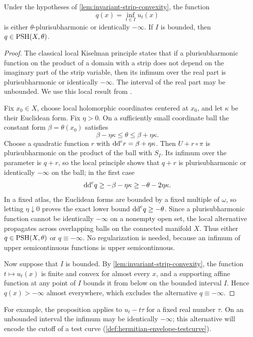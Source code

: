 \begin{proposition}\label{prop:hermitian-kiselman}
Under the hypotheses of \cref{lem:invariant-strip-convexity}, the function
\[
 q(x)=\inf_{t\in I}u_t(x)
\]
is either $\theta$-plurisubharmonic or identically $-\infty$. If $I$ is bounded, then $q\in\mathrm{PSH}(X,\theta)$.
\end{proposition}
\begin{proof}
The classical local Kiselman principle states that if a plurisubharmonic function on the product of a domain with a strip does not depend on the imaginary part of the strip variable, then its infimum over the real part is plurisubharmonic or identically $-\infty$. The interval of the real part may be unbounded. We use this local result from \cite{SGPT}.

Fix $x_0\in X$, choose local holomorphic coordinates centered at $x_0$, and let $\kappa$ be their Euclidean form. Fix $\eta>0$. On a sufficiently small coordinate ball the constant form $\beta=\theta(x_0)$ satisfies
\[
 \beta-\eta\kappa\leq\theta\leq\beta+\eta\kappa.
\]
Choose a quadratic function $r$ with $\mathrm{dd}^{\mathrm{c}} r=\beta+\eta\kappa$. Then $U+r\circ\pi$ is plurisubharmonic on the product of the ball with $S_I$. Its infimum over the parameter is $q+r$, so the local principle shows that $q+r$ is plurisubharmonic or identically $-\infty$ on the ball; in the first case
\[
 \mathrm{dd}^{\mathrm{c}} q\geq-\beta-\eta\kappa\geq-\theta-2\eta\kappa.
\]
In a fixed atlas, the Euclidean forms are bounded by a fixed multiple of $\omega$, so letting $\eta\downarrow0$ proves the exact lower bound $\mathrm{dd}^{\mathrm{c}} q\geq-\theta$. Since a plurisubharmonic function cannot be identically $-\infty$ on a nonempty open set, the local alternative propagates across overlapping balls on the connected manifold $X$. Thus either $q\in\mathrm{PSH}(X,\theta)$ or $q\equiv-\infty$. No regularization is needed, because an infimum of upper semicontinuous functions is upper semicontinuous.

Now suppose that $I$ is bounded. By \cref{lem:invariant-strip-convexity}, the function $t\mapsto u_t(x)$ is finite and convex for almost every $x$, and a supporting affine function at any point of $I$ bounds it from below on the bounded interval $I$. Hence $q(x)>-\infty$ almost everywhere, which excludes the alternative $q\equiv-\infty$.
\end{proof}

For example, the proposition applies to $u_t-t\tau$ for a fixed real number $\tau$. On an unbounded interval the infimum may be identically $-\infty$; this alternative will encode the cutoff of a test curve (\cref{def:hermitian-envelope-testcurve}).

